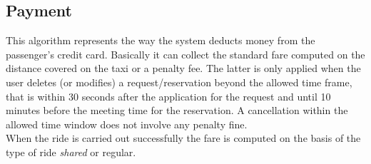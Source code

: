 \documentclass[a4paper,11pt]{report} %
\begin{document}
	\subsection{Payment}
	This algorithm represents the way the system deducts money from the passenger's credit card. Basically it can collect the standard fare computed on the distance covered on the taxi or a penalty fee. The latter is only applied when the user deletes (or modifies) a request/reservation beyond the allowed time frame, that is within 30 seconds after the application for the request and until 10 minutes before the meeting time for the reservation. A cancellation within the allowed time window does not involve any penalty fine.\\
	When the ride is carried out successfully the fare is computed on the basis of the type of ride \textit{shared} or regular.\\
	
\end{document}
